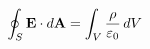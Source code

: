 \documentclass[preview]{standalone}
\begin{document}
\begin{align*}
\special{dvisvgm:raw <g id='unique000'>}\oint_S\mathbf E\cdot d\mathbf A=\int_V\frac{\rho}{\varepsilon_0}\,dV\special{dvisvgm:raw </g>}
\end{align*}
\end{document}
